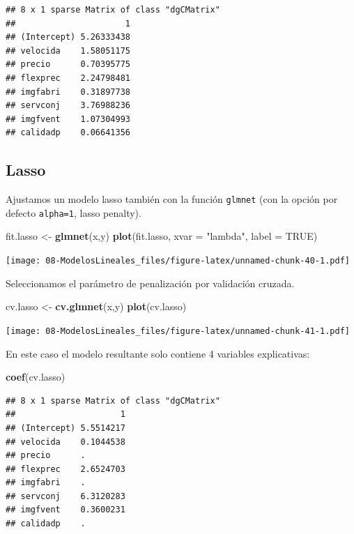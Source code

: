\documentclass[]{book}
\newenvironment{Shaded}{\begin{snugshade}}{\end{snugshade}}
\newcommand{\KeywordTok}[1]{\textcolor[rgb]{0.13,0.29,0.53}{\textbf{#1}}}
\newcommand{\DataTypeTok}[1]{\textcolor[rgb]{0.13,0.29,0.53}{#1}}
\newcommand{\StringTok}[1]{\textcolor[rgb]{0.31,0.60,0.02}{#1}}
\newcommand{\OtherTok}[1]{\textcolor[rgb]{0.56,0.35,0.01}{#1}}
\newcommand{\NormalTok}[1]{#1}
\begin{document}
\begin{verbatim}
## 8 x 1 sparse Matrix of class "dgCMatrix"
##                      1
## (Intercept) 5.26333438
## velocida    1.58051175
## precio      0.70395775
## flexprec    2.24798481
## imgfabri    0.31897738
## servconj    3.76988236
## imgfvent    1.07304993
## calidadp    0.06641356
\end{verbatim}

\subsection{Lasso}\label{lasso}

Ajustamos un modelo lasso también con la función \texttt{glmnet} (con la
opción por defecto \texttt{alpha=1}, lasso penalty).

\begin{Shaded}
\begin{Highlighting}[]
\NormalTok{fit.lasso <-}\StringTok{ }\KeywordTok{glmnet}\NormalTok{(x,y)}
\KeywordTok{plot}\NormalTok{(fit.lasso, }\DataTypeTok{xvar =} \StringTok{"lambda"}\NormalTok{, }\DataTypeTok{label =} \OtherTok{TRUE}\NormalTok{)}
\end{Highlighting}
\end{Shaded}

\texttt{[image: 08-ModelosLineales\_files/figure-latex/unnamed-chunk-40-1.pdf]}

Seleccionamos el parámetro de penalización por validación cruzada.

\begin{Shaded}
\begin{Highlighting}[]
\NormalTok{cv.lasso <-}\StringTok{ }\KeywordTok{cv.glmnet}\NormalTok{(x,y)}
\KeywordTok{plot}\NormalTok{(cv.lasso)}
\end{Highlighting}
\end{Shaded}

\texttt{[image: 08-ModelosLineales\_files/figure-latex/unnamed-chunk-41-1.pdf]}

En este caso el modelo resultante solo contiene 4 variables
explicativas:

\begin{Shaded}
\begin{Highlighting}[]
\KeywordTok{coef}\NormalTok{(cv.lasso)}
\end{Highlighting}
\end{Shaded}

\begin{verbatim}
## 8 x 1 sparse Matrix of class "dgCMatrix"
##                     1
## (Intercept) 5.5514217
## velocida    0.1044538
## precio      .        
## flexprec    2.6524703
## imgfabri    .        
## servconj    6.3120283
## imgfvent    0.3600231
## calidadp    .
\end{verbatim}
\end{document}
